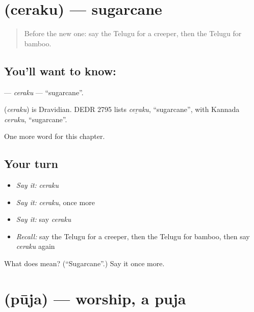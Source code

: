 \section[\texorpdfstring{\te{చెరకు} (ceraku)}{చెరకు (ceraku)}]{ (ceraku) — sugarcane}

\label{lesson:TE-C303-ceraku}



\begin{quote}
Before the new one: say the Telugu for a creeper, then the Telugu for bamboo.
\end{quote}

\subsection*{You'll want to know: }
\textbf{} — \emph{ceraku} — \textquotedblleft{}sugarcane\textquotedblright{}.

\begin{cousinweb}
\textbf{} (\emph{ceraku}) is Dravidian. DEDR 2795 lists \emph{ceṟaku}, \textquotedblleft{}sugarcane\textquotedblright{}, with Kannada \emph{ceruku}, \textquotedblleft{}sugarcane\textquotedblright{}.
\end{cousinweb}

\begin{grammarlens}[title={What you've built}]
One more word for this chapter.
\end{grammarlens}

\subsection*{Your turn}
\begin{itemize}
\raggedright
  \item \emph{Say it:} \emph{ceraku}
  \item \emph{Say it:} \emph{ceraku}, once more
  \item \emph{Say it:} say \emph{ceraku}
  \item \emph{Recall:} say the Telugu for a creeper, then the Telugu for bamboo, then say \emph{ceraku} again
\end{itemize}

\begin{tcolorbox}[breakable,colback=teal!4,colframe=teal!35!black,title={Before you move on}]
What does  mean? (\textquotedblleft{}Sugarcane\textquotedblright{}.) Say it once more.
\end{tcolorbox}
\section[\texorpdfstring{\te{పూజ} (pūja)}{పూజ (pūja)}]{ (pūja) — worship, a puja}

